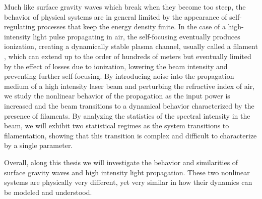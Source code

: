 Much like surface gravity waves which break when  they become too steep, the behavior of physical systems are in general limited by the appearance of self-regulating processes that keep the energy density finite.
In the case of a high-intensity light pulse  propagating in air, the self-focusing eventually produces ionization, creating a dynamically stable plasma channel, usually called a filament \citep{Chin2006,Braun1994}, which can extend   up to the order of hundreds of meters \citep{Rodriguez2004} but  eventually limited by the effect of losses due to ionization, lowering  the beam intensity and preventing further self-focusing.
By introducing noise  into the propagation medium of a high intensity laser beam and perturbing the refractive index of air, we  study  the nonlinear behavior of the propagation  as the input  power is increased and the beam transitions to a dynamical behavior characterized by the presence of filaments. 
By analyzing the statistics of the spectral intensity in the beam, we will exhibit two statistical regimes as the system transitions to filamentation, showing that this transition is complex and  difficult to characterize  by a single parameter.


Overall, along this thesis we will investigate the behavior and similarities of surface gravity waves and high intensity light propagation. These two nonlinear systems  are physically very different, yet very similar in how their dynamics can be modeled and understood.

%

%
%
